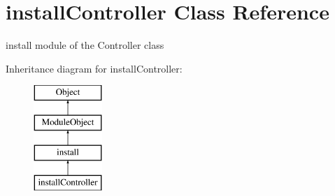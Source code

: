 \hypertarget{classinstallController}{}\section{install\+Controller Class Reference}
\label{classinstallController}


install module of the Controller class  


Inheritance diagram for install\+Controller\+:\begin{figure}[H]
\begin{center}
\leavevmode
\includegraphics[height=4.000000cm]{classinstallController}
\end{center}
\end{figure}
